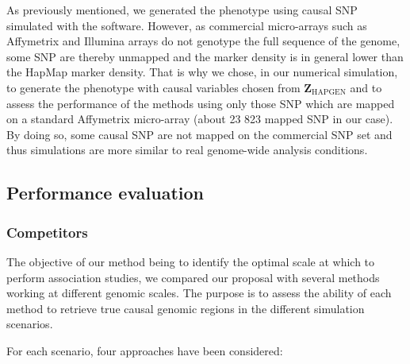 \documentclass[]{book}
\begin{document}
As previously mentioned, we generated the phenotype using causal SNP
simulated with the software. However, as commercial micro-arrays such as
Affymetrix and Illumina arrays do not genotype the full sequence of the
genome, some SNP are thereby unmapped and the marker density is in
general lower than the HapMap marker density. That is why we chose, in
our numerical simulation, to generate the phenotype with causal
variables chosen from \(\mathbf{Z}_{\text{HAPGEN}}\) and to assess the
performance of the methods using only those SNP which are mapped on a
standard Affymetrix micro-array (about 23 823 mapped SNP in our case).
By doing so, some causal SNP are not mapped on the commercial SNP set
and thus simulations are more similar to real genome-wide analysis
conditions.

\hypertarget{perfeval}{%
\subsection{Performance evaluation}\label{perfeval}}

\hypertarget{competitors}{%
\subsubsection{Competitors}\label{competitors}}

The objective of our method being to identify the optimal scale at which
to perform association studies, we compared our proposal with several
methods working at different genomic scales. The purpose is to assess
the ability of each method to retrieve true causal genomic regions in
the different simulation scenarios.

For each scenario, four approaches have been considered:

\end{document}
